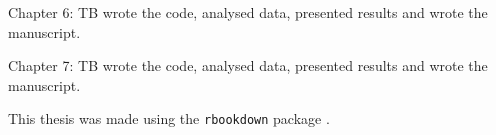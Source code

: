 \documentclass[
]{book}
\begin{document}
Chapter 6: TB wrote the code, analysed data, presented results and wrote the manuscript.

Chapter 7: TB wrote the code, analysed data, presented results and wrote the manuscript.

This thesis was made using the \texttt{rbookdown} package \citep{rbookdownpkg}.

  
\end{document}
